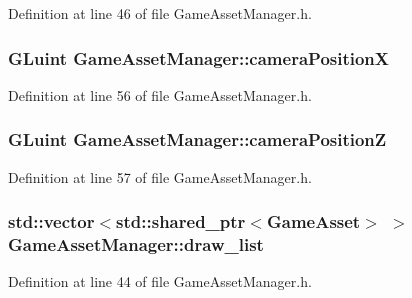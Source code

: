 Definition at line 46 of file Game\+Asset\+Manager.\+h.

\hypertarget{class_game_asset_manager_a011295db68f0413a94700c5aa2778c45}{}
\subsubsection[{camera\+Position\+X}]{\setlength{\rightskip}{0pt plus 5cm}G\+Luint Game\+Asset\+Manager\+::camera\+Position\+X\hspace{0.3cm}{\ttfamily [private]}}\label{class_game_asset_manager_a011295db68f0413a94700c5aa2778c45}


Definition at line 56 of file Game\+Asset\+Manager.\+h.

\hypertarget{class_game_asset_manager_a076d00cef5f59a5038e168a0cc80420d}{}
\subsubsection[{camera\+Position\+Z}]{\setlength{\rightskip}{0pt plus 5cm}G\+Luint Game\+Asset\+Manager\+::camera\+Position\+Z\hspace{0.3cm}{\ttfamily [private]}}\label{class_game_asset_manager_a076d00cef5f59a5038e168a0cc80420d}


Definition at line 57 of file Game\+Asset\+Manager.\+h.

\hypertarget{class_game_asset_manager_a671cddd92f1de4186c582fe0c4297b7d}{}
\subsubsection[{draw\+\_\+list}]{\setlength{\rightskip}{0pt plus 5cm}std\+::vector$<$std\+::shared\+\_\+ptr$<${\bf Game\+Asset}$>$ $>$ Game\+Asset\+Manager\+::draw\+\_\+list\hspace{0.3cm}{\ttfamily [private]}}\label{class_game_asset_manager_a671cddd92f1de4186c582fe0c4297b7d}


Definition at line 44 of file Game\+Asset\+Manager.\+h.

